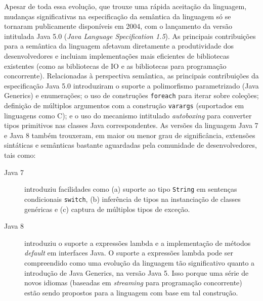 Apesar de toda essa evolu\c c\~{a}o, que 
trouxe uma r\'{a}pida aceita\c c\~{a}o da linguagem, 
mudan\c cas significativas na especifica\c c\~{a}o 
da sem\^{a}ntica da linguagem s\'{o} se 
tornaram publicamente dispon\'{i}veis em 2004, 
com o lan\c camento da vers\~{a}o intitulada 
Java 5.0 (\emph{Java Language Specification 1.5}). As principais 
contribui\c c\~{o}es para a sem\^{a}ntica da linguagem afetavam 
diretamente a produtividade dos desenvolvedores e incluiam 
implementa\c c\~{o}es mais eficientes de bibliotecas 
existentes (como as bibliotecas de IO e as bibliotecas 
para programa\c c\~{a}o concorrente). Relacionadas \`{a} 
perspectiva sem\^{a}ntica, as principais contribui\c c\~{o}es 
da especifica\c c\~{a}o Java 5.0 introduziram o suporte 
a polimorfismo parametrizado (Java Generics) e enumera\c c\~{o}es; 
o uso de constru\c c\~{o}es \texttt{foreach} para iterar 
sobre cole\c c\~{o}es; defini\c c\~{a}o de m\'{u}ltiplos 
argumentos com a constru\c c\~{a}o \texttt{varargs} (suportados em 
linguagens como C); e o uso do mecanismo intitulado 
\emph{autoboxing} para converter tipos primitivos nas 
classes Java correspondentes. 
As vers\~{o}es da linguagem Java 7 e Java 8 tamb\'{e}m trouxeram, 
em maior ou menor grau de signific\^{a}ncia, extens\~{o}es sint\'{a}ticas 
e sem\^{a}nticas bastante aguardadas pela comunidade de 
desenvolvedores, tais como:

\begin{description}
\item[Java 7] introduziu facilidades como (a) suporte ao tipo \texttt{String} 
em senten\c cas condicionais \texttt{switch}, (b) infer\^{e}ncia de tipos 
na instancia\c c\~{a}o de classes gen\'{e}ricas e (c) captura de 
m\'{u}ltiplos tipos de exce\c c\~{a}o. 

\item[Java 8] introduziu o suporte a express\~{o}es lambda e a implementa\c c\~{a}o de 
m\'{e}todos \emph{default} em interfaces Java. O suporte a express\~{o}es lambda pode 
ser compreendido como uma evolu\c c\~{a}o da linguagem t\~{a}o significativo 
quanto a introdu\c c\~{a}o de Java Generics, na vers\~{a}o Java 5. Isso porque 
uma s\'{e}rie de novos idiomas (baseadas em \emph{streaming} para programa\c c\~{a}o 
concorrente) est\~{a}o sendo propostos para a linguagem com base em tal constru\c c\~{a}o.   
\end{description} 



